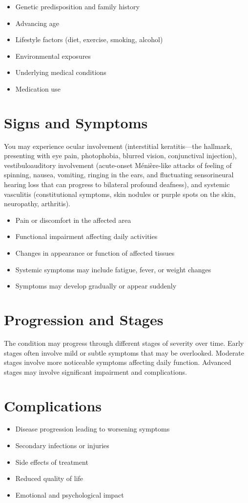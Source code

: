 \begin{itemize}[noitemsep]
  \item Genetic predisposition and family history
  \item Advancing age
  \item Lifestyle factors (diet, exercise, smoking, alcohol)
  \item Environmental exposures
  \item Underlying medical conditions
  \item Medication use
\end{itemize}
\section{Signs and Symptoms}
You may experience ocular involvement (interstitial keratitis---the hallmark, presenting with eye pain, photophobia, blurred vision, conjunctival injection), vestibuloauditory involvement (acute-onset Ménière-like attacks of feeling of spinning, nausea, vomiting, ringing in the ears, and fluctuating sensorineural hearing loss that can progress to bilateral profound deafness), and systemic vasculitis (constitutional symptoms, skin nodules or purple spots on the skin, neuropathy, arthritis).

\begin{itemize}[noitemsep]
  \item Pain or discomfort in the affected area
  \item Functional impairment affecting daily activities
  \item Changes in appearance or function of affected tissues
  \item Systemic symptoms may include fatigue, fever, or weight changes
  \item Symptoms may develop gradually or appear suddenly
\end{itemize}
\section{Progression and Stages}
The condition may progress through different stages of severity over time. Early stages often involve mild or subtle symptoms that may be overlooked. Moderate stages involve more noticeable symptoms affecting daily function. Advanced stages may involve significant impairment and complications.
\section{Complications}
\begin{itemize}[noitemsep]
  \item Disease progression leading to worsening symptoms
  \item Secondary infections or injuries
  \item Side effects of treatment
  \item Reduced quality of life
  \item Emotional and psychological impact
\end{itemize}
